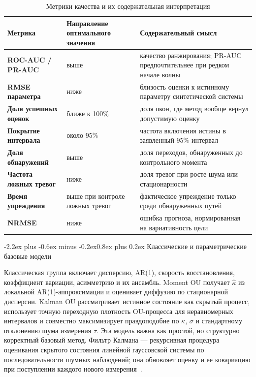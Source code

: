 \documentclass[12pt,a4paper]{article}
\makeatletter
\numberwithin{table}{section}
\numberwithin{figure}{section}
\renewcommand\subsection{\@startsection{subsection}{2}{0pt}
  {-2.2ex plus -0.6ex minus -0.2ex}{0.8ex plus 0.2ex}
  {\normalfont\normalsize\bfseries}}
\makeatother
\begin{document}
\begin{table}[H]
\caption{Метрики качества и их содержательная интерпретация}
\label{tab:metrics}
\centering\small
\begin{tabularx}{\textwidth}{>{\bfseries}p{31mm}p{32mm}X}
\toprule
Метрика & Направление оптимального значения & Содержательный смысл \\
\midrule
ROC-AUC / PR-AUC & выше & качество ранжирования; PR-AUC предпочтительнее при редком начале волны~\cite{saito2015} \\
RMSE параметра & ниже & близость оценки к истинному параметру синтетической системы \\
Доля успешных оценок & ближе к 100\% & доля окон, где метод вообще вернул допустимую оценку \\
Покрытие интервала & около 95\% & частота включения истины в заявленный 95\% интервал \\
Доля обнаружений & выше & доля переходов, обнаруженных до контрольного момента \\
Частота ложных тревог & ниже & доля тревог при росте шума или стационарности \\
Время упреждения & выше при контроле ложных тревог & фактическое упреждение только среди обнаруженных путей \\
NRMSE & ниже & ошибка прогноза, нормированная на вариативность цели \\
\bottomrule
\end{tabularx}
\end{table}

\subsection{Классические и параметрические базовые модели}

Классическая группа включает дисперсию, AR(1), скорость восстановления,
коэффициент вариации, асимметрию и их ансамбль. Moment OU получает
$\widehat\kappa$ из локальной AR(1)-аппроксимации и оценивает диффузию по
стационарной дисперсии.
Kalman OU рассматривает истинное состояние как скрытый процесс, использует
точную переходную плотность OU-процесса для неравномерных интервалов и
совместно максимизирует правдоподобие по $\kappa$, $\sigma$ и стандартному
отклонению шума измерения $\tau$. Эта модель важна как простой, но структурно
корректный базовый метод. Фильтр Калмана --- рекурсивная процедура оценивания
скрытого состояния линейной гауссовской системы по последовательности шумных
наблюдений; она обновляет оценку и ее ковариацию при поступлении каждого нового
измерения~\cite{kalman1960}.
\end{document}
